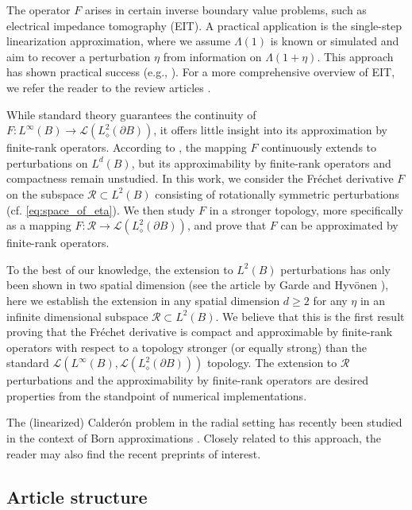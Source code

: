 \documentclass[reqno]{amsart}
\numberwithin{equation}{section}
\numberwithin{figure}{section}
\numberwithin{table}{section}
\theoremstyle{plain}
\theoremstyle{definition}
\theoremstyle{remark}
\newcommand{\sphe}{{\partial B}}
\begin{document}
The operator \( F \) arises in certain inverse boundary value problems, such as electrical impedance tomography (EIT).
%
A practical application is the single-step linearization approximation, where we assume \( \Lambda(1) \) is known or simulated and aim to recover a perturbation \( \eta \) from information on \( \Lambda(1 + \eta) \).
%
This approach has shown practical success (e.g., \cite{Cheney90}).
%
For a more comprehensive overview of EIT, we refer the reader to the review articles \cite{Cheney99, Uhlmann2009, Borcea2002a}.
%


While standard theory guarantees the continuity of \( F : L^\infty(B) \to \mathscr{L}(L^2_\diamond(\sphe)) \), it offers little insight into its approximation by finite-rank operators.
%
According to \cite[Appendix~A]{Garde2025}, the mapping \( F \) continuously extends to perturbations on \( L^d(B) \), but its approximability by finite-rank operators and compactness remain unstudied.
%
In this work, we consider the Fr\'echet derivative \( F \) on the subspace \( \mathcal{R} \subset L^2(B) \) consisting of rotationally symmetric perturbations (cf. \eqref{eq:space_of_eta}).
%
We then study \( F \) in a stronger topology, more specifically as a mapping \( F : \mathcal{R} \to \mathscr{L}(L^2_\diamond(\sphe)) \), and prove that \( F \) can be approximated by finite-rank operators.
%


To the best of our knowledge, the extension to \( L^2(B) \) perturbations has only been shown in two spatial dimension (see the article by Garde and Hyv\"onen \cite{GH2024}), here we establish the extension in any spatial dimension \( d \geq 2 \) for any \( \eta \) in an infinite dimensional subspace \( \mathcal{R} \subset L^2(B) \).
%
We believe that this is the first result proving that the Fr\'echet derivative is compact and approximable by finite-rank operators with respect to a topology stronger (or equally strong) than the standard \( \mathscr{L}(L^\infty(B), \mathscr{L}(L^2_\diamond(\sphe))) \) topology.
%
The extension to \( \mathcal{R} \) perturbations and the approximability by finite-rank operators are desired properties from the standpoint of numerical implementations.
%


The (linearized) Calder{\'o}n problem in the radial setting has recently been studied in the context of Born approximations \cite{Barcelo2022, Barcelo2024}.
%
Closely related to this approach, the reader may also find the recent preprints \cite{Daude2026, Castro2026} of interest.
%


\subsection{Article structure}
\end{document}
